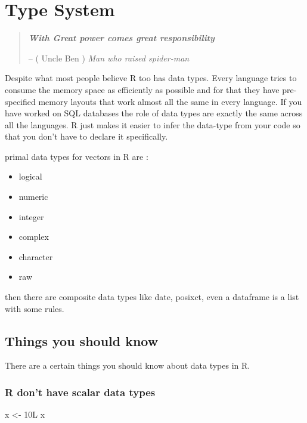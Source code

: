 \documentclass[
]{book}
\newenvironment{Shaded}{\begin{snugshade}}{\end{snugshade}}
\newcommand{\NormalTok}[1]{#1}
\newcommand{\OtherTok}[1]{\textcolor[rgb]{0.56,0.35,0.01}{#1}}
\begin{document}
\hypertarget{types}{%
\chapter{Type System}\label{types}}

\begin{quote}
\textbf{\emph{With Great power comes great responsibility}}

-- ( Uncle Ben ) \emph{Man who raised spider-man}
\end{quote}

Despite what most people believe R too has data types. Every language tries to consume the memory space as efficiently as possible and for that they have pre-specified memory layouts that work almost all the same in every language. If you have worked on SQL databases the role of data types are exactly the same across all the languages. R just makes it easier to infer the data-type from your code so that you don't have to declare it specifically.

primal data types for vectors in R are :

\begin{itemize}
\item
  logical
\item
  numeric
\item
  integer
\item
  complex
\item
  character
\item
  raw
\end{itemize}

then there are composite data types like date, posixct, even a dataframe is a list with some rules.

\hypertarget{things-you-should-know}{%
\section{Things you should know}\label{things-you-should-know}}

There are a certain things you should know about data types in R.

\hypertarget{r-dont-have-scalar-data-types}{%
\subsection{R don't have scalar data types}\label{r-dont-have-scalar-data-types}}

\begin{Shaded}
\begin{Highlighting}[]
\NormalTok{x }\OtherTok{\textless{}{-}}\NormalTok{ 10L}
\NormalTok{x}
\end{Highlighting}
\end{Shaded}
\end{document}
